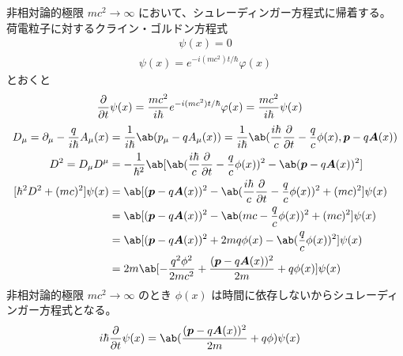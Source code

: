 \documentclass[uplatex,dvipdfmx,a4paper,11pt]{jlreq}
\theoremstyle{definition}
\renewcommand{\AA}{\hat{A}}
\renewcommand{\AA}{\bm{A}}
\newcommand{\pp}{\bm{p}}
\numberwithin{equation}{section}
\begin{document}
非相対論的極限 $mc^2\to\infty$ において、シュレーディンガー方程式に帰着する。
荷電粒子に対するクライン・ゴルドン方程式
\begin{align}
  [\hbar^2D^2 + (mc)^2]\psi(x) = 0
\end{align}
\begin{align}
  \psi(x) = e^{-i(mc^2)t/\hbar}\varphi(x)
\end{align}
とおくと
\begin{align}
  \diffp{}{t}\psi(x) & = \frac{mc^2}{i\hbar}e^{-i(mc^2)t/\hbar}\varphi(x) = \frac{mc^2}{i\hbar}\psi(x)
\end{align}
\begin{align}
  D_\mu = \partial_\mu - \frac{q}{i\hbar}A_\mu(x) & = \frac{1}{i\hbar}\ab(p_\mu - qA_\mu(x)) = \frac{1}{i\hbar}\ab(\frac{i\hbar}{c}\diffp{}{t} - \frac{q}{c}\phi(x), \pp - q\AA(x)) \\
  D^2 = D_\mu D^\mu                               & = -\frac{1}{\hbar^2}\ab[\ab(\frac{i\hbar}{c}\diffp{}{t} - \frac{q}{c}\phi(x))^2 - \ab(\pp - q\AA(x))^2]                         \\
  [\hbar^2D^2 + (mc)^2]\psi(x)                    & = \ab[(\pp - q\AA(x))^2 - \ab(\frac{i\hbar}{c}\diffp{}{t} - \frac{q}{c}\phi(x))^2 + (mc)^2]\psi(x)                              \\
                                                  & = \ab[(\pp - q\AA(x))^2 - \ab(mc - \frac{q}{c}\phi(x))^2 + (mc)^2]\psi(x)                                                       \\
                                                  & = \ab[(\pp - q\AA(x))^2 + 2mq\phi(x) - \ab(\frac{q}{c}\phi(x))^2]\psi(x)                                                        \\
                                                  & = 2m\ab[-\frac{q^2\phi^2}{2mc^2} + \frac{(\pp - q\bm{A}(x))^2}{2m} + q\phi(x)]\psi(x)
\end{align}
非相対論的極限 $mc^2\to\infty$ のとき $\phi(x)$ は時間に依存しないからシュレーディンガー方程式となる。
\begin{align}
  i\hbar\diffp{}{t}\psi(x) & = \ab(\frac{(\pp - q\bm{A}(x))^2}{2m} + q\phi)\psi(x)
\end{align}
\end{document}

